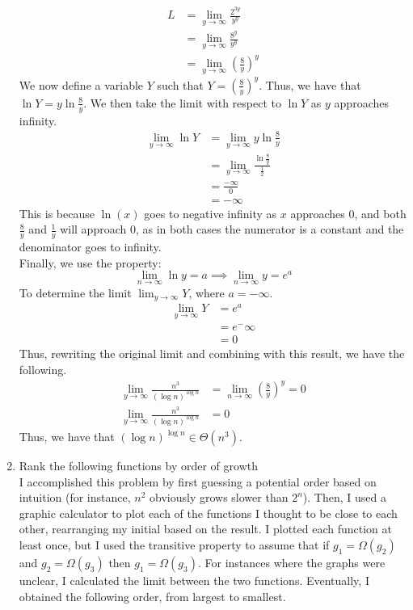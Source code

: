 \documentclass{article}
\begin{document}
\begin{enumerate}
\begin{align}
		L &= \lim_{y\to\infty} \frac{2^{3y}}{y^y} \\
		&= \lim_{y\to\infty} \frac{8^y}{y^y} \\
		&= \lim_{y\to\infty} (\frac{8}{y})^y
	\end{align}
	We now define a variable $Y$ such that $Y = (\frac{8}{y})^y$. Thus, we have that $\ln Y = y \ln \frac{8}{y}$. We then take the limit with respect to $\ln Y$ as $y$ approaches infinity.
	\begin{align}
		\lim_{y\to\infty} \ln Y &= \lim_{y\to\infty} y \ln \frac{8}{y} \\
		&= \lim_{y\to\infty} \frac{\ln \frac{8}{y}}{\frac{1}{2}} \\
		&= \frac{- \infty}{0} \\
		&= - \infty
	\end{align}
	This is because $\ln(x)$ goes to negative infinity as $x$ approaches 0, and both $\frac{8}{y}$ and $\frac{1}{y}$ will approach 0, as in both cases the numerator is a constant and the denominator goes to infinity.
	\\ Finally, we use the property:
	$$\lim_{n\to\infty} \ln y = a \implies \lim_{n\to\infty} y = e^a$$
	To determine the limit $\lim_{y\to\infty} Y$, where $a= - \infty$.
	\begin{align}
	\lim_{y\to\infty} Y &= e^a \\
	&= e^-\infty \\
	&= 0
	\end{align}
	Thus, rewriting the original limit and combining with this result, we have the following.
	\begin{align}
		\lim_{y\to\infty} \frac{n^3}{(\log n)^{\log n}} &= \lim_{n\to\infty} (\frac{8}{y})^y = 0 \\
		\lim_{y\to\infty} \frac{n^3}{(\log n)^{\log n}} &= 0
	\end{align}
	Thus, we have that $(\log n)^{\log n} \in \Theta (n^3)$.
	\item Rank the following functions by order of growth
	\\ I accomplished this problem by first guessing a potential order based on intuition (for instance, $n^2$ obviously grows slower than $2^n$). Then, I used a graphic calculator to plot each of the functions I thought to be close to each other, rearranging my initial based on the result. I plotted each function at least once, but I used the transitive property to assume that if $g_1=\Omega (g_2)$ and $g_2=\Omega (g_3)$ then $g_1=\Omega (g_3)$. For instances where the graphs were unclear, I calculated the limit between the two functions. Eventually, I obtained the following order, from largest to smallest.

\end{enumerate}
\end{document}
